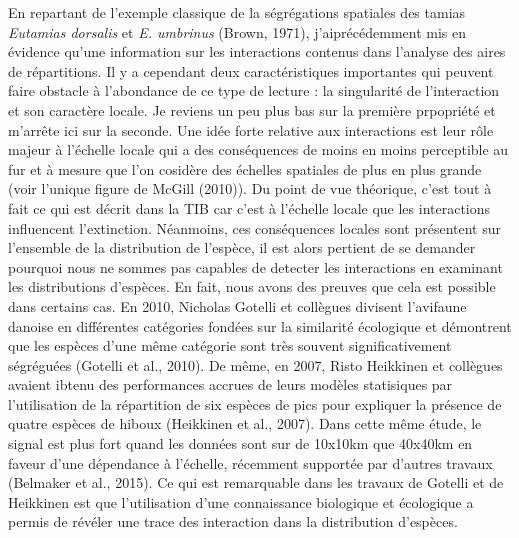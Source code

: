 En repartant de l'exemple classique de la ségrégations spatiales des
tamias \emph{Eutamias dorsalis} et \emph{E. umbrinus} (Brown, 1971),
j'aiprécédemment mis en évidence qu'une information sur les interactions
contenus dans l'analyse des aires de répartitions. Il y a cependant deux
caractéristiques importantes qui peuvent faire obstacle à l'abondance de
ce type de lecture : la singularité de l'interaction et son caractère
locale. Je reviens un peu plus bas sur la première prpopriété et
m'arrête ici sur la seconde. Une idée forte relative aux interactions
est leur rôle majeur à l'échelle locale qui a des conséquences de moins
en moins perceptible au fur et à mesure que l'on cosidère des échelles
spatiales de plus en plus grande (voir l'unique figure de McGill
(2010)). Du point de vue théorique, c'est tout à fait ce qui est décrit
dans la TIB car c'est à l'échelle locale que les interactions
influencent l'extinction. Néanmoins, ces conséquences locales sont
présentent sur l'ensemble de la distribution de l'espèce, il est alors
pertient de se demander pourquoi nous ne sommes pas capables de detecter
les interactions en examinant les distributions d'espèces. En fait, nous
avons des preuves que cela est possible dans certains cas. En 2010,
Nicholas Gotelli et collègues divisent l'avifaune danoise en différentes
catégories fondées sur la similarité écologique et démontrent que les
espèces d'une même catégorie sont très souvent significativement
ségréguées (Gotelli et al., 2010). De même, en 2007, Risto Heikkinen et
collègues avaient ibtenu des performances accrues de leurs modèles
statisiques par l'utilisation de la répartition de six espèces de pics
pour expliquer la présence de quatre espèces de hiboux (Heikkinen et
al., 2007). Dans cette même étude, le signal est plus fort quand les
données sont sur de 10x10km que 40x40km en faveur d'une dépendance à
l'échelle, récemment supportée par d'autres travaux (Belmaker et al.,
2015). Ce qui est remarquable dans les travaux de Gotelli et de
Heikkinen est que l'utilisation d'une connaissance biologique et
écologique a permis de révéler une trace des interaction dans la
distribution d'espèces.


